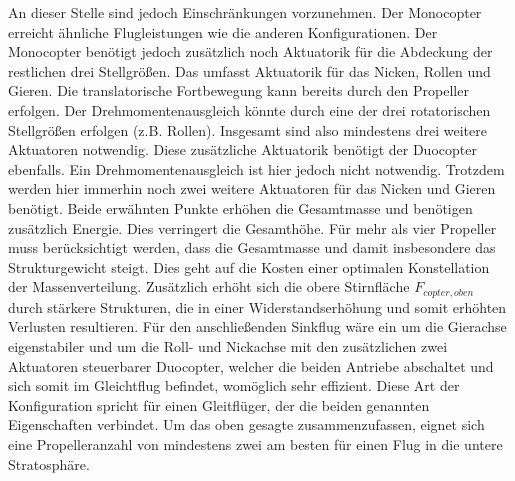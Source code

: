 An dieser Stelle sind jedoch Einschränkungen vorzunehmen. 
Der Monocopter erreicht ähnliche Flugleistungen wie die anderen Konfigurationen. Der Monocopter benötigt jedoch zusätzlich noch Aktuatorik für die Abdeckung der restlichen drei Stellgrößen. Das umfasst Aktuatorik für das Nicken, Rollen und Gieren. Die translatorische Fortbewegung kann bereits durch den Propeller erfolgen. Der Drehmomentenausgleich könnte durch eine der drei rotatorischen Stellgrößen erfolgen (z.B. Rollen). Insgesamt sind also mindestens drei weitere Aktuatoren notwendig. Diese zusätzliche Aktuatorik benötigt der Duocopter ebenfalls. Ein Drehmomentenausgleich ist hier jedoch nicht notwendig. Trotzdem werden hier immerhin noch zwei weitere Aktuatoren für das Nicken und Gieren benötigt. 
Beide erwähnten Punkte erhöhen die Gesamtmasse und benötigen zusätzlich Energie. Dies verringert die Gesamthöhe. 
Für mehr als vier Propeller muss berücksichtigt werden, dass die Gesamtmasse und damit insbesondere das Strukturgewicht steigt. Dies geht auf die Kosten einer optimalen Konstellation der Massenverteilung. Zusätzlich erhöht sich die obere Stirnfläche \ensuremath{F_{copter,oben}} durch stärkere Strukturen, die in einer Widerstandserhöhung und somit erhöhten Verlusten resultieren. 
Für den anschließenden Sinkflug wäre ein um die Gierachse eigenstabiler und um die Roll- und Nickachse mit den zusätzlichen zwei Aktuatoren steuerbarer Duocopter, welcher die beiden Antriebe abschaltet und sich somit im Gleichtflug befindet, womöglich sehr effizient. Diese Art der Konfiguration spricht für einen Gleitflüger, der die beiden genannten Eigenschaften verbindet.
Um das oben gesagte zusammenzufassen, eignet sich eine Propelleranzahl von mindestens zwei am besten für einen Flug in die untere Stratosphäre. \\


